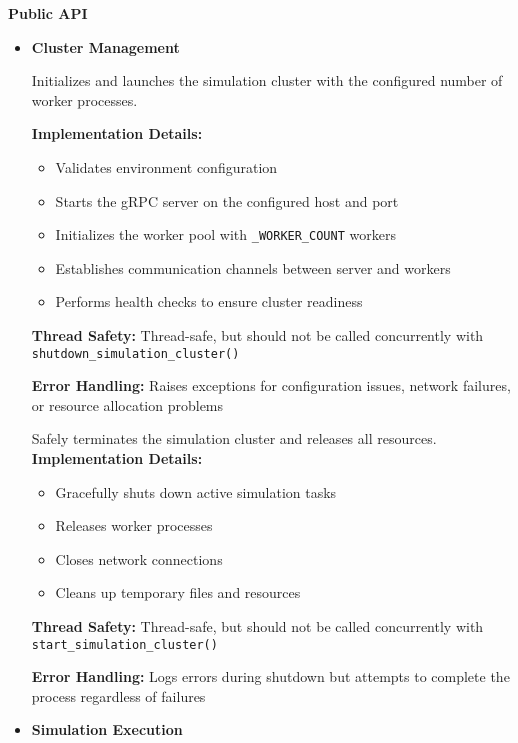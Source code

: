 \textbf{Public API}
\begin{itemize}
	\item \textbf{Cluster Management}
		
	 
	 Initializes and launches the simulation cluster with the configured number of worker processes.
	 
	 \textbf{Implementation Details:}
	 \begin{itemize}
	 	\item Validates environment configuration
	 	\item Starts the gRPC server on the configured host and port
	 	\item Initializes the worker pool with \texttt{\_WORKER\_COUNT} workers
	 	\item Establishes communication channels between server and workers
	 	\item Performs health checks to ensure cluster readiness
	 \end{itemize}
	 
	 \textbf{Thread Safety:} Thread-safe, but should not be called concurrently with \texttt{shutdown\_simulation\_cluster()}
	 
	 \textbf{Error Handling:} Raises exceptions for configuration issues, network failures, or resource allocation problems
	 
	
	Safely terminates the simulation cluster and releases all resources.
	\textbf{Implementation Details:}
	\begin{itemize}
		\item Gracefully shuts down active simulation tasks
		\item Releases worker processes
		\item Closes network connections
		\item Cleans up temporary files and resources
	\end{itemize}
	
	\textbf{Thread Safety:} Thread-safe, but should not be called concurrently with \texttt{start\_simulation\_cluster()}
	
	\textbf{Error Handling:} Logs errors during shutdown but attempts to complete the process regardless of failures
	
	\item \textbf{Simulation Execution}
	

\end{itemize}
